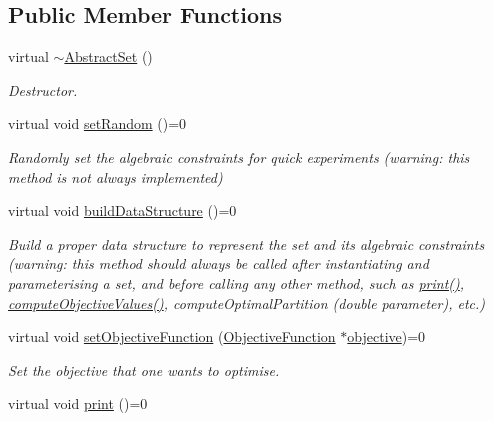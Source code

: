 \subsection*{Public Member Functions}
\begin{DoxyCompactItemize}
\item 
\hypertarget{classAbstractSet_adc3db5afd11de63639ddd079ef4ecf45}{virtual \hyperlink{classAbstractSet_adc3db5afd11de63639ddd079ef4ecf45}{$\sim$\-Abstract\-Set} ()}\label{classAbstractSet_adc3db5afd11de63639ddd079ef4ecf45}

\begin{DoxyCompactList}\small\item\em Destructor. \end{DoxyCompactList}\item 
\hypertarget{classAbstractSet_aac0cf2d0ef47c49aa0a7ac393691ff7a}{virtual void \hyperlink{classAbstractSet_aac0cf2d0ef47c49aa0a7ac393691ff7a}{set\-Random} ()=0}\label{classAbstractSet_aac0cf2d0ef47c49aa0a7ac393691ff7a}

\begin{DoxyCompactList}\small\item\em Randomly set the algebraic constraints for quick experiments (warning\-: this method is not always implemented) \end{DoxyCompactList}\item 
\hypertarget{classAbstractSet_a735009927cfae61baa66bbf7b53f76d5}{virtual void \hyperlink{classAbstractSet_a735009927cfae61baa66bbf7b53f76d5}{build\-Data\-Structure} ()=0}\label{classAbstractSet_a735009927cfae61baa66bbf7b53f76d5}

\begin{DoxyCompactList}\small\item\em Build a proper data structure to represent the set and its algebraic constraints (warning\-: this method should always be called after instantiating and parameterising a set, and before calling any other method, such as \hyperlink{classAbstractSet_ae20f14f4e4209570d26c3614c00e02df}{print()}, \hyperlink{classAbstractSet_a341945c465179a52da09356a2aa50a8d}{compute\-Objective\-Values()}, compute\-Optimal\-Partition (double parameter), etc.) \end{DoxyCompactList}\item 
virtual void \hyperlink{classAbstractSet_a7aef71679a18ab7965d1098da15b26c2}{set\-Objective\-Function} (\hyperlink{classObjectiveFunction}{Objective\-Function} $\ast$\hyperlink{classAbstractSet_a0217447a042827703e1ea7655f0fc099}{objective})=0
\begin{DoxyCompactList}\small\item\em Set the objective that one wants to optimise. \end{DoxyCompactList}\item 
\hypertarget{classAbstractSet_ae20f14f4e4209570d26c3614c00e02df}{virtual void \hyperlink{classAbstractSet_ae20f14f4e4209570d26c3614c00e02df}{print} ()=0}\label{classAbstractSet_ae20f14f4e4209570d26c3614c00e02df}


\end{DoxyCompactItemize}
